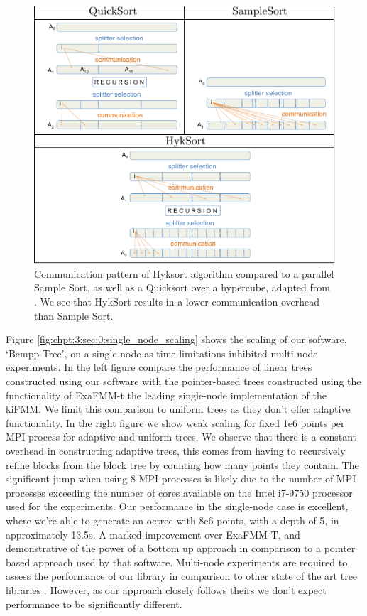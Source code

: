 \begin{figure}
    \centerline{\includegraphics[width=0.7\linewidth]{images/ch_3/hyksort.pdf}}
    \caption{Communication pattern of Hyksort algorithm compared to a parallel Sample Sort, as well as a Quicksort over a hypercube, adapted from \cite{sundar2013hyksort}. We see that HykSort results in a lower communication overhead than Sample Sort.}
    \label{fig:chpt:3:sec:0:hyksort}
\end{figure}


Figure \ref{fig:chpt:3:sec:0:single_node_scaling} shows the scaling of our software, `Bempp-Tree', on a single node as time limitations inhibited multi-node experiments. In the left figure compare the performance of linear trees constructed using our software with the pointer-based trees constructed using the functionality of ExaFMM-t the leading single-node implementation of the kiFMM. We limit this comparison to uniform trees as they don't offer adaptive functionality. In the right figure we show weak scaling for fixed 1e6 points per MPI process for adaptive and uniform trees. We observe that there is a constant overhead in constructing adaptive trees, this comes from having to recursively refine blocks from the block tree by counting how many points they contain. The significant jump when using 8 MPI processes is likely due to the number of MPI processes exceeding the number of cores available on the Intel i7-9750 processor used for the experiments. Our performance in the single-node case is excellent, where we're able to generate an octree with 8e6 points, with a depth of 5, in approximately 13.5s. A marked improvement over ExaFMM-T, and demonstrative of the power of a bottom up approach in comparison to a pointer based approach used by that software. Multi-node experiments are required to assess the performance of our library in comparison to other state of the art tree libraries \cite{sampath2008dendro,BursteddeWilcoxGhattas11}. However, as our approach closely follows theirs we don't expect performance to be significantly different.

